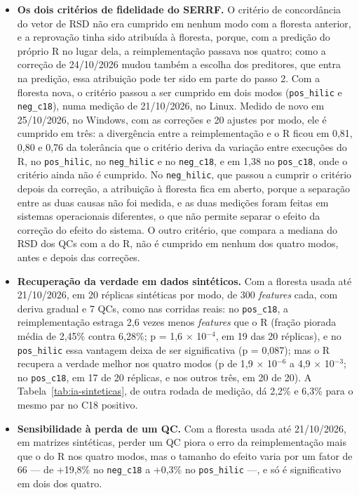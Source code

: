\begin{itemize}
\item \textbf{Os dois critérios de fidelidade do SERRF.} O critério de concordância do vetor de RSD não era cumprido em nenhum modo com a floresta anterior, e a reprovação tinha sido atribuída à floresta, porque, com a predição do próprio R no lugar dela, a reimplementação passava nos quatro; como a correção de 24/10/2026 mudou também a escolha dos preditores, que entra na predição, essa atribuição pode ter sido em parte do passo 2. Com a floresta nova, o critério passou a ser cumprido em dois modos (\texttt{pos\_\allowbreak{}hilic} e \texttt{neg\_\allowbreak{}c18}), numa medição de 21/10/2026, no Linux. Medido de novo em 25/10/2026, no Windows, com as correções e 20 ajustes por modo, ele é cumprido em três: a divergência entre a reimplementação e o R ficou em 0,81, 0,80 e 0,76 da tolerância que o critério deriva da variação entre execuções do R, no \texttt{pos\_\allowbreak{}hilic}, no \texttt{neg\_\allowbreak{}hilic} e no \texttt{neg\_\allowbreak{}c18}, e em 1,38 no \texttt{pos\_\allowbreak{}c18}, onde o critério ainda não é cumprido. No \texttt{neg\_\allowbreak{}hilic}, que passou a cumprir o critério depois da correção, a atribuição à floresta fica em aberto, porque a separação entre as duas causas não foi medida, e as duas medições foram feitas em sistemas operacionais diferentes, o que não permite separar o efeito da correção do efeito do sistema. O outro critério, que compara a mediana do RSD dos QCs com a do R, não é cumprido em nenhum dos quatro modos, antes e depois das correções.
\item \textbf{Recuperação da verdade em dados sintéticos.} Com a floresta usada até 21/10/2026, em 20 réplicas sintéticas por modo, de 300 \textit{features} cada, com deriva gradual e 7 QCs, como nas corridas reais: no \texttt{pos\_\allowbreak{}c18}, a reimplementação estraga 2,6 vezes menos \textit{features} que o R (fração piorada média de 2,45\% contra 6,28\%; p = 1,6 $\times$ 10$^{-4}$, em 19 das 20 réplicas), e no \texttt{pos\_\allowbreak{}hilic} essa vantagem deixa de ser significativa (p = 0,087); mas o R recupera a verdade melhor nos quatro modos (p de 1,9 $\times$ 10$^{-6}$ a 4,9 $\times$ 10$^{-3}$; no \texttt{pos\_\allowbreak{}c18}, em 17 de 20 réplicas, e nos outros três, em 20 de 20). A Tabela~\ref{tab:ia-sinteticas}, de outra rodada de medição, dá 2,2\% e 6,3\% para o mesmo par no C18 positivo.
\item \textbf{Sensibilidade à perda de um QC.} Com a floresta usada até 21/10/2026, em matrizes sintéticas, perder um QC piora o erro da reimplementação mais que o do R nos quatro modos, mas o tamanho do efeito varia por um fator de 66 --- de +19,8\% no \texttt{neg\_\allowbreak{}c18} a +0,3\% no \texttt{pos\_\allowbreak{}hilic} ---, e só é significativo em dois dos quatro.
\end{itemize}

